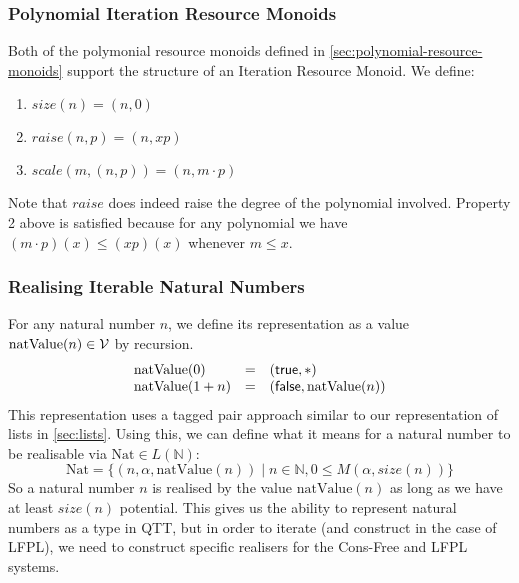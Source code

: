 \documentclass[acmsmall,review]{acmart}
\begin{document}
\subsubsection{Polynomial Iteration Resource Monoids}

Both of the polymonial resource monoids defined in
\autoref{sec:polynomial-resource-monoids} support the structure of an
Iteration Resource Monoid. We define:
\begin{enumerate}
\item $\mathit{size}(n) = (n, 0)$
\item $\mathit{raise}(n, p) = (n, xp)$
\item $\mathit{scale}(m, (n, p)) = (n, m \cdot p)$
\end{enumerate}
Note that $\mathit{raise}$ does indeed raise the degree of the
polynomial involved. Property 2 above is satisfied because for any
polynomial we have $(m \cdot p)(x) \leq (xp)(x)$ whenever $m \leq x$.

\subsubsection{Realising Iterable Natural Numbers}

For any natural number $n$, we define its representation as a value
$\mathrm{natValue}(n) \in \mathcal{V}$ by recursion.
\begin{displaymath}
  \begin{array}{lcl}
    \mathrm{natValue}(0) &=& (\mathsf{true} , *) \\
    \mathrm{natValue}(1 + n) &=& (\mathsf{false}, \mathrm{natValue}(n))
  \end{array}
\end{displaymath}
This representation uses a tagged pair approach similar to our
representation of lists in \autoref{sec:lists}. Using this, we can
define what it means for a natural number to be realisable via
$\mathrm{Nat} \in L(\mathbb{N})$:
\begin{displaymath}
  \mathrm{Nat} = \{(n, \alpha, \mathrm{natValue}(n)) \mid n \in \mathbb{N}, 0 \leq M(\alpha, \mathit{size}(n)) \}
\end{displaymath}
So a natural number $n$ is realised by the value
$\mathrm{natValue}(n)$ as long as we have at least $\mathit{size}(n)$
potential.  This gives us the ability to represent natural numbers as
a type in QTT, but in order to iterate (and construct in the case of
LFPL), we need to construct specific realisers for the Cons-Free and
LFPL systems.
\end{document}
